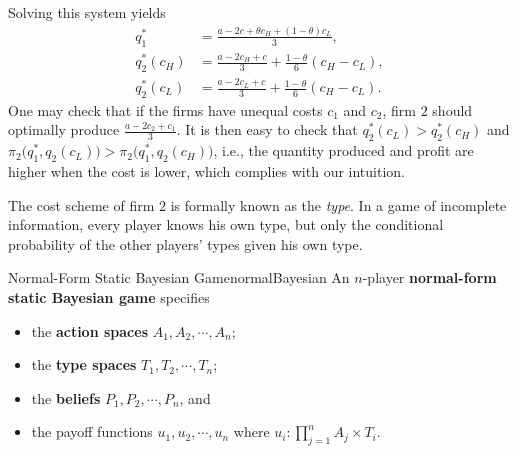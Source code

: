 \documentclass[math]{amznotes}
\theoremstyle{remark}
\begin{document}
Solving this system yields 
\begin{align*}
    q_1^* & = \frac{a - 2c + \theta c_H + \left(1 - \theta\right)c_L}{3}, \\
    q_2^*\left(c_H\right) & = \frac{a - 2 c_H + c}{3} + \frac{1 - \theta}{6}\left(c_H - c_L\right), \\
    q_2^*\left(c_L\right) & = \frac{a - 2 c_L + c}{3} + \frac{1 - \theta}{6}\left(c_H - c_L\right).
\end{align*}
One may check that if the firms have unequal costs $c_1$ and $c_2$, firm $2$ should optimally produce $\frac{a - 2c_2 + c_1}{3}$. It is then easy to check that $q_2^*\left(c_L\right) > q_2^*\left(c_H\right)$ and $\pi_2\bigl(q_1^*, q_2\left(c_L\right)\bigr) > \pi_2\bigl(q_1^*, q_2\left(c_H\right)\bigr)$, i.e., the quantity produced and profit are higher when the cost is lower, which complies with our intuition.

The cost scheme of firm $2$ is formally known as the \textit{type}. In a game of incomplete information, every player knows his own type, but only the conditional probability of the other players' types given his own type.
\begin{dfnbox}{Normal-Form Static Bayesian Game}{normalBayesian}
    An $n$-player {\color{red} \textbf{normal-form static Bayesian game}} specifies 
    \begin{itemize}
        \item the {\color{red} \textbf{action spaces}} $A_1, A_2, \cdots, A_n$;
        \item the {\color{red} \textbf{type spaces}} $T_1, T_2, \cdots, T_n$;
        \item the {\color{red} \textbf{beliefs}} $P_1, P_2, \cdots, P_n$, and 
        \item the payoff functions $u_1, u_2, \cdots, u_n$ where $u_i \colon \prod_{j = 1}^nA_j \times T_i$.
    \end{itemize}
\end{dfnbox}
\end{document}
